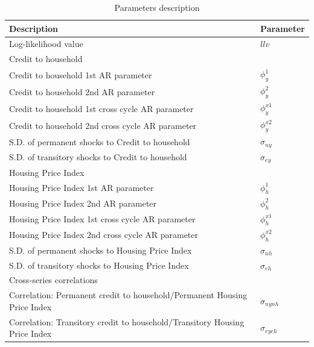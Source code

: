\documentclass[
  12pt,
]{article}
\begin{document}
        \begin{table}[H]
            \begin{threeparttable}
                \caption {\label{tab:table1} Parameters description}
                \begin{tabular}{@{}ll@{}}
                    \toprule
                    Description & Parameter\\
                    \midrule
                    Log-likelihood value & $llv$ \\[2pt] 
                    Credit to household & \\
                    \quad Credit to household 1st AR parameter  & $\phi^1_{y}$ \\[2pt] 
                    \quad Credit to household 2nd AR parameter  & $\phi^2_{y}$ \\[2pt] 
                    \quad Credit to household 1st cross cycle AR parameter  & $\phi^{x1}_{y}$ \\[2pt] 
                    \quad Credit to household 2nd cross cycle AR parameter  & $\phi^{x2}_{y}$ \\[2pt] 
                    \quad S.D. of permanent shocks to Credit to household & $\sigma_{ny}$ \\[2pt] 
                    \quad S.D. of transitory shocks to Credit to household & $\sigma_{ey}$ \\[2pt]
                    Housing Price Index & \\
                    \quad Housing Price Index 1st AR parameter  & $\phi^1_{h}$ \\[2pt] 
                    \quad Housing Price Index 2nd AR parameter  & $\phi^2_{h}$ \\[2pt] 
                    \quad Housing Price Index 1st cross cycle AR parameter  & $\phi^{x1}_{h}$ \\[2pt] 
                    \quad Housing Price Index 2nd cross cycle AR parameter  & $\phi^{x2}_{h}$ \\[2pt] 
                    \quad S.D. of permanent shocks to Housing Price Index & $\sigma_{nh}$ \\[2pt] 
                    \quad S.D. of transitory shocks to Housing Price Index & $\sigma_{eh}$ \\[2pt]
                    Cross-series correlations & \\
                    \quad Correlation: Permanent credit to household/Permanent Housing Price Index  & $\sigma_{nynh}$ \\[2pt] 
                    \quad Correlation: Transitory credit to household/Transitory Housing Price Index  & $\sigma_{eyeh}$ \\[2pt] 
                                        

\end{tabular}
\end{threeparttable}
\end{table}
\end{document}
